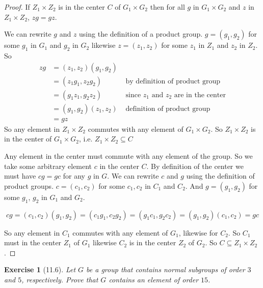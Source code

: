 \documentclass[12pt]{article}
\newtheorem*{exer}{Exercise}
\begin{document}
\begin{proof}

    If $Z_1 \times Z_2$ is in the center $C$ of $G_1 \times G_2$ then 
    for all $g$ in $G_1 \times G_2$ and $z$ in $Z_1 \times Z_2$, $zg =
    gz$.

    We can rewrite $g$ and $z$ using the definition of a product group.
    $g = (g_1, g_2)$ for some $g_1$ in $G_1$ and $g_2$ in $G_2$ likewise
    $z = (z_1, z_2)$ for some $z_1$ in $Z_1$ and $z_2$ in $Z_2$. So
    \begin{align*}
        zg &= (z_1, z_2)(g_1, g_2) \\
           &= (z_1 g_1, z_2 g_2) &\text{ by definition of product group}
           \\
           &= (g_1 z_1, g_2 z_2) &\text{ since $z_1$ and $z_2$ are in the
           center} \\
           &= (g_1, g_2)(z_1, z_2) &\text{ definition of product group}
           \\
           &= gz
    \end{align*}
    So any element in $Z_1 \times Z_2$ commutes with any element of $G_1
    \times G_2$. So $Z_1 \times Z_2$ is in the center of $G_1 \times
    G_2$, i.e. $Z_1 \times Z_2 \subseteq C$ 

    Any element in the center must commute with any element of the
    group.  So we take some arbitrary element $c$ in the center $C$.  By
    definition of the center we must have $cg = gc$ for any $g$  in $G$.
    We can rewrite $c$ and $g$ using the definition of product groups.
    $c = (c_1, c_2)$ for some $c_1, c_2$ in $C_1$ and $C_2$. And $g =
    (g_1, g_2)$ for some $g_1$, $g_2$ in $G_1$ and $G_2$.
    
    \[
        cg = (c_1, c_2)(g_1, g_2) = (c_1g_1, c_2g_2) = (g_1c_1, g_2c_2)
        = (g_1, g_2)(c_1, c_2) = gc
    \]

    So any element in $C_1$ commutes with any element of $G_1$, likewise
    for $C_2$. So $C_1$ must in the center $Z_1$ of $G_1$ likewise $C_2$
    is in the center $Z_2$ of $G_2$. So $C \subseteq Z_1 \times Z_2$.

\end{proof}


\begin{exer}[11.6]
Let $G$ be a group that contains normal subgroups of order $3$ and $5$,
respectively. Prove that $G$ contains an element of order $15$.
\end{exer}
\end{document}
